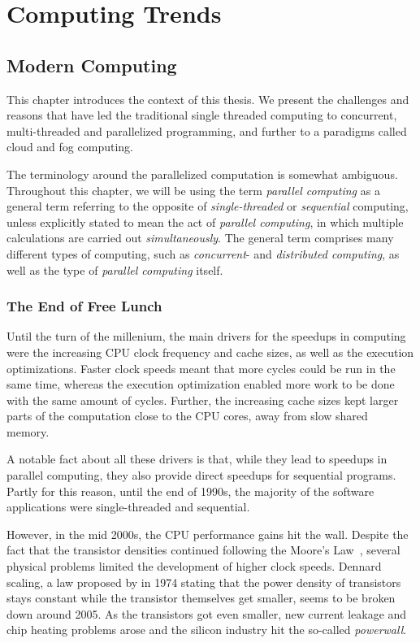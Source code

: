 \chapter{Computing Trends}
\label{chapter:computing-trends}

\section{Modern Computing}
This chapter introduces the context of this thesis. We present the challenges and reasons that have led the traditional single threaded computing to concurrent, multi-threaded and parallelized programming, and further to a paradigms called cloud and fog computing.

The terminology around the parallelized computation is somewhat ambiguous. Throughout this chapter, we will be using the term \emph{parallel computing} as a general term referring to the opposite of \emph{single-threaded} or \emph{sequential} computing, unless explicitly stated to mean the act of \emph{parallel computing}, in which multiple calculations are carried out \emph{simultaneously}. The general term comprises many different types of computing, such as \emph{concurrent}- and \emph{distributed computing}, as well as the type of \emph{parallel computing} itself.

\subsection{The End of Free Lunch}
\label{subsection:the-end-of-free-lunch}
Until the turn of the millenium, the main drivers for the speedups in computing were the increasing CPU clock frequency and cache sizes, as well as the execution optimizations. Faster clock speeds meant that more cycles could be run in the same time, whereas the execution optimization enabled more work to be done with the same amount of cycles. Further, the increasing cache sizes kept larger parts of the computation close to the CPU cores, away from slow shared memory.~\cite{Sutter:2005:FLiO}

A notable fact about all these drivers is that, while they lead to speedups in parallel computing, they also provide direct speedups for sequential programs. Partly for this reason, until the end of 1990s, the majority of the software applications were single-threaded and sequential.~\cite{Sutter:2005:FLiO}

However, in the mid 2000s, the CPU performance gains hit the wall. Despite the fact that the transistor densities continued following the Moore's Law~\cite{Moore:1998:MooresLaw}, several physical problems limited the development of higher clock speeds. Dennard scaling, a law proposed by in 1974 stating that the power density of transistors stays constant while the transistor themselves get smaller, seems to be broken down around 2005. As the transistors got even smaller, new current leakage and chip heating problems arose and the silicon industry hit the so-called \emph{powerwall}.~\cite{Esmaeilzadeh:2011:DSE, Sutter:2005:FLiO, Ributzka:2013:Concurrency}

